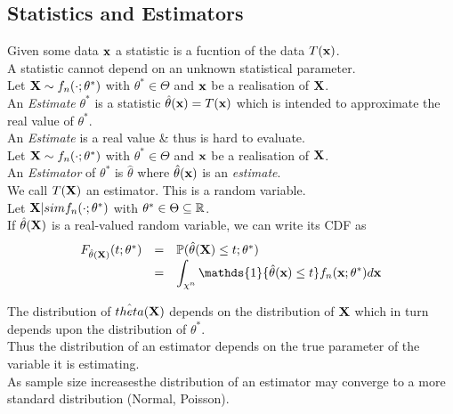 \documentclass[11pt,a4paper]{article}
\begin{document}
\subsection{Statistics and Estimators}

Given some data $\textbf{x}$ a statistic is a fucntion of the data $T(\textbf{x})$.\\
\nb A statistic cannot depend on an unknown statistical parameter.\\

Let $\textbf{X}\sim f_n(\cdot;\theta^*)$ with $\theta^*\in\Theta$ and $\textbf{x}$ be a realisation of $\textbf{X}$.\\
An \textit{Estimate} $\theta^*$ is a statistic $\hat{\theta}(\textbf{x})=T(\textbf{x})$ which is intended to approximate the real value of $\theta^*$.\\
\nb An \textit{Estimate} is a real value \& thus is hard to evaluate.\\

Let $\textbf{X}\sim f_n(\cdot;\theta^*)$ with $\theta^*\in\Theta$ and $\textbf{x}$ be a realisation of $\textbf{X}$.\\
An \textit{Estimator} of $\theta^*$ is $\hat{\theta}$ where $\hat{\theta}(\textbf{x})$ is an \textit{estimate}.\\
\nb We call $T(\textbf{X})$ an estimator. This is a random variable.\\

Let $\textbf{X}|sim f_n(\cdot;\theta^*)$ with $\theta^*\in\Theta\subseteq\mathbb{R}$.\\
If $\hat{\theta}(\textbf{X})$ is a real-valued random variable, we can write its CDF as
\[\begin{array}{rcl}
F_{\hat{\theta}(\X)}(t;\theta^*)&=&\prob(\hat{\theta}(\X)\leq t;\theta^*)\\
&=&{\displaystyle \int_{\chi^n}\mathds{1}\{\hat{\theta}(\x)\leq t\}f_n(\x;\theta^*)d\x}
\end{array}\]

The distribution of $\hat{theta}(\textbf{X})$ depends on the distribution of $\textbf{X}$ which in turn depends upon the distribution of $\theta^*$.\\
Thus the distribution of an estimator depends on the true parameter of the variable it is estimating.\\

As sample size increasesthe distribution of an estimator may converge to a more standard distribution (\eg Normal, Poisson).
\end{document}
